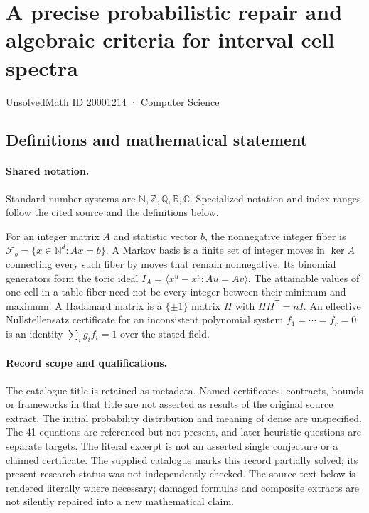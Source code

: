 \documentclass[11pt]{article}
\begin{document}
\setcounter{section}{20001213}
\section{A precise probabilistic repair and algebraic criteria for interval cell spectra}\label{20001214}
{\small\sffamily UnsolvedMath ID 20001214 · Computer Science}
\subsection{Definitions and mathematical statement}

\paragraph{Shared notation.}Standard number systems are $\mathbb N,\mathbb Z,\mathbb Q,\mathbb R,\mathbb C$. Specialized notation and index ranges follow the cited source and the definitions below.


For an integer matrix $A$ and statistic vector $b$, the nonnegative integer fiber is $\mathcal F_b=\{x\in\mathbb N^d:Ax=b\}$. A Markov basis is a finite set of integer moves in $\ker A$ connecting every such fiber by moves that remain nonnegative. Its binomial generators form the toric ideal $I_A=\langle x^u-x^v:Au=Av\rangle$. The attainable values of one cell in a table fiber need not be every integer between their minimum and maximum. A Hadamard matrix is a $\{\pm1\}$ matrix $H$ with $HH^{\mathsf T}=nI$. An effective Nullstellensatz certificate for an inconsistent polynomial system $f_1=\cdots=f_r=0$ is an identity $\sum_i g_if_i=1$ over the stated field.
\paragraph{Record scope and qualifications.}
The catalogue title is retained as metadata. Named certificates, contracts, bounds or frameworks in that title are not asserted as results of the original source extract.
The initial probability distribution and meaning of dense are unspecified. The 41 equations are referenced but not present, and later heuristic questions are separate targets. The literal excerpt is not an asserted single conjecture or a claimed certificate. The supplied catalogue marks this record partially solved; its present research status was not independently checked.
The source text below is rendered literally where necessary; damaged formulas and composite extracts are not silently repaired into a new mathematical claim.
\end{document}
